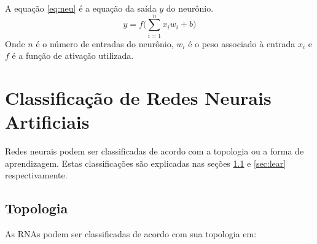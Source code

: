 A equação \ref{eq:neu} é a equação da saída $y$ do neurônio.
\begin{equation}\label{eq:neu}
y = f \Big(\sum_{i=1}^{n}x_iw_i +b\Big)
\end{equation}
Onde $n$ é o número de entradas do neurônio, $w_i$
 é o peso associado à entrada $x_i$ e $f$ é a função de ativação utilizada. 


\section{Classificação de Redes Neurais Artificiais}
\label{sec:class}
\quad Redes neurais podem ser classificadas de acordo com a topologia ou a forma de aprendizagem. Estas classificações são explicadas nas seções \ref{sec:top} e \ref{sec:lear} respectivamente.

\subsection{Topologia}
\label{sec:top}
As RNAs podem ser classificadas de acordo com sua topologia em:
